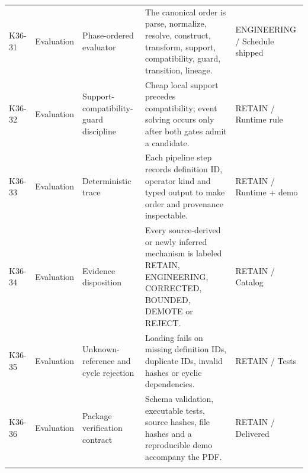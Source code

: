 \begin{longtable}{>{\raggedright\arraybackslash}p{1.0cm}>{\raggedright\arraybackslash}p{2.4cm}>{\raggedright\arraybackslash}p{3.2cm}>{\raggedright\arraybackslash}p{7.1cm}>{\raggedright\arraybackslash}p{2.3cm}}
\addlinespace[1.5pt]
K36-31 & Evaluation & Phase-ordered evaluator & The canonical order is parse, normalize, resolve, construct, transform, support, compatibility, guard, transition, lineage. & ENGINEERING / Schedule shipped \\
\addlinespace[1.5pt]
K36-32 & Evaluation & Support-compatibility-guard discipline & Cheap local support precedes compatibility; event solving occurs only after both gates admit a candidate. & RETAIN / Runtime rule \\
\addlinespace[1.5pt]
K36-33 & Evaluation & Deterministic trace & Each pipeline step records definition ID, operator kind and typed output to make order and provenance inspectable. & RETAIN / Runtime + demo \\
\addlinespace[1.5pt]
K36-34 & Evaluation & Evidence disposition & Every source-derived or newly inferred mechanism is labeled RETAIN, ENGINEERING, CORRECTED, BOUNDED, DEMOTE or REJECT. & RETAIN / Catalog \\
\addlinespace[1.5pt]
K36-35 & Evaluation & Unknown-reference and cycle rejection & Loading fails on missing definition IDs, duplicate IDs, invalid hashes or cyclic dependencies. & RETAIN / Tests \\
\addlinespace[1.5pt]
K36-36 & Evaluation & Package verification contract & Schema validation, executable tests, source hashes, file hashes and a reproducible demo accompany the PDF. & RETAIN / Delivered \\
\addlinespace[1.5pt]
\bottomrule
\end{longtable}
